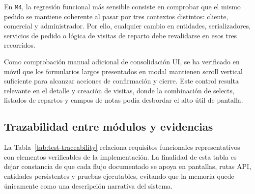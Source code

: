 En \texttt{M4}, la regresión funcional más sensible consiste en comprobar que el mismo pedido se mantiene coherente al pasar por tres contextos distintos: cliente, comercial y administrador. Por ello, cualquier cambio en entidades, serializadores, servicios de pedido o lógica de visitas de reparto debe revalidarse en esos tres recorridos.

Como comprobación manual adicional de consolidación UI, se ha verificado en móvil que los formularios largos presentados en modal mantienen scroll vertical suficiente para alcanzar acciones de confirmación y cierre. Este control resulta relevante en el detalle y creación de visitas, donde la combinación de selects, listados de repartos y campos de notas podía desbordar el alto útil de pantalla.

\subsection{Trazabilidad entre módulos y evidencias}

La Tabla~\ref{tab:test-traceability} relaciona requisitos funcionales representativos con elementos verificables de la implementación. La finalidad de esta tabla es dejar constancia de que cada flujo documentado se apoya en pantallas, rutas API, entidades persistentes y pruebas ejecutables, evitando que la memoria quede únicamente como una descripción narrativa del sistema.

